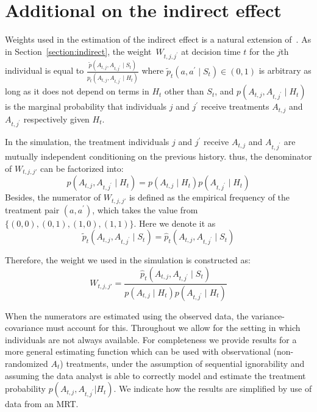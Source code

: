 \documentclass[12pt]{article}
\begin{document}
\section{Additional on the indirect effect}
\label{app:addindirect}

Weights used in the estimation of the indirect effect is a natural extension of~\cite{Boruvkaetal}. As in Section~\ref{section:indirect}, the weight~$W_{t,j, j^\prime}$ at decision time $t$ for the $j$th individual is equal to $\frac{\tilde p (A_{t,j}, A_{t,j^\prime} \mid S_t)}{p_t (A_{t,j}, A_{t,j^\prime} \mid H_t)}$ where $\tilde p_t (a, a^\prime \mid S_t)\in (0,1)$ is arbitrary as long as it does not depend on terms in $H_t$ other than $S_t$, and $p(A_{t,j}, A_{t,j^\prime} \mid H_t)$ is the marginal probability that individuals $j$ and $j^\prime$ receive treatments $A_{t,j}$ and $A_{t,j^\prime}$ respectively given $H_t$.

In the simulation, the treatment individuals $j$ and $j^\prime$ receive $A_{t,j}$ and $A_{t,j^\prime}$ are mutually independent conditioning on the previous history. thus, the denominator of $W_{t,j,j\prime}$ can be factorized into:
\[ p(A_{t,j}, A_{t,j^\prime} \mid H_t)= p(A_{t,j} \mid H_t)p(A_{t,j^\prime} \mid H_t) \]
Besides, the numerator of  $W_{t,j,j\prime}$ is defined as the empirical frequency of the treatment pair $ (a, a^\prime)$, which takes the value from $\{(0,0),(0,1),(1,0),(1,1)\}$. Here we denote it as \[\tilde p_t (A_{t,j}, A_{t,j^\prime} \mid S_t) = \hat p_t (A_{t,j}, A_{t,j^\prime} \mid S_t)\]

Therefore, the weight we used in the simulation is constructed as:
\[
W_{t,j,j\prime} = \frac{\hat p_t (A_{t,j}, A_{t,j^\prime} \mid S_t)}{p(A_{t,j} \mid H_t)p(A_{t,j^\prime} \mid H_t)}
\]

When the numerators are estimated using the observed data, the variance-covariance must account for this. Throughout we allow for the setting in which individuals are not always available. For completeness we provide results for a more general estimating function which can be used with observational (non-randomized $A_t$) treatments, under the assumption of sequential ignorability and assuming the data analyst is able to correctly model and estimate the treatment probability $p\left(A_{t,j}, A_{t,j^\prime}| H_t\right)$. We indicate how the results are simpliﬁed by use of data from an MRT.
\end{document}
